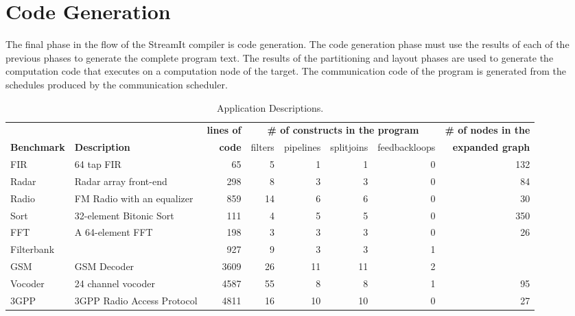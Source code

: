 \section{Code Generation}
\label{sec:codegen}

The final phase in the flow of the StreamIt compiler is code
generation.  The code generation phase must use the results of each of
the previous phases to generate the complete program text.  The
results of the partitioning and layout phases are used to generate the
computation code that executes on a computation node of the target.
The communication code of the program is generated from the schedules
produced by the communication scheduler.

\begin{table*}[t]
\begin{center}
\scriptsize
\begin{tabular}{|l|l||r||r|r|r|r||r|} \hline
 & & {\bf lines of} & \multicolumn{4}{|c||}{\bf \# of constructs in the program} & {\bf \# of nodes in the} \\ \cline{4-7}
{\bf Benchmark} & {\bf Description} & {\bf code} & filters & pipelines & splitjoins & feedbackloops & {\bf expanded graph}
\\
\hline \hline
FIR & 64 tap FIR & 
65 & 5 & 1 & 1 & 0 & 132
\\ \hline
Radar & Radar array front-end\cite{pca} & 
298 & 8 & 3 & 3 & 0 & 84
\\ \hline
Radio & FM Radio with an equalizer & 
859 & 14 & 6 & 6 & 0 & 30
\\ \hline
Sort & 32-element Bitonic Sort & 
111 & 4 & 5 & 5 & 0 & 350
\\  \hline
FFT & A 64-element FFT & 
198 & 3 & 3 & 3 & 0 & 26
\\  \hline
Filterbank & & 
927 & 9 & 3 & 3 & 1 & 
\\  \hline
GSM & GSM Decoder & 
3609 & 26 & 11 & 11 & 2 &
\\ \hline
Vocoder & 24 channel vocoder &  
4587 & 55 & 8 & 8 & 1 & 95
\\ \hline
3GPP & 3GPP Radio Access Protocol &  
4811 & 16 & 10 & 10 & 0 & 27
\\ \hline
\hline
\end{tabular}
\vspace{-6pt}
\caption{\protect\small Application Descriptions.}
\label{tab:benchmarks}
\vspace{-12pt}
\end{center}
\end{table*}

